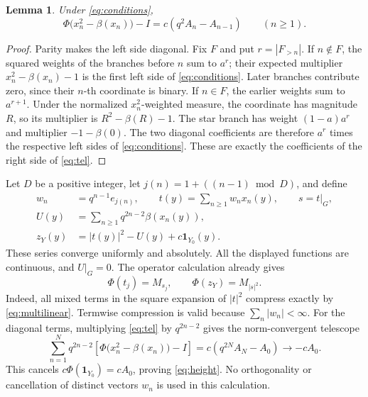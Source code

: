 \documentclass[11pt,letterpaper]{amsart}
\newtheorem{lemma}[theorem]{Lemma}
\theoremstyle{definition}
\theoremstyle{remark}
\numberwithin{equation}{section}
\begin{document}
\begin{lemma}\label{lem:tel}
Under \eqref{eq:conditions},
\begin{equation}\label{eq:tel}
       \Phi\bigl(x_n^2-\beta(x_n)\bigr)-I
                       =c(q^2A_n-A_{n-1})\qquad(n\ge1).
\end{equation}
\end{lemma}
\begin{proof}
Parity makes the left side diagonal. Fix \(F\) and put
\(r=|F_{>n}|\). If \(n\notin F\), the squared weights of the
branches before \(n\) sum to \(a^r\); their expected multiplier
\(x_n^2-\beta(x_n)-1\) is the first left side of
\eqref{eq:conditions}. Later branches contribute zero, since their
\(n\)-th coordinate is binary.
If \(n\in F\), the earlier weights sum to \(a^{r+1}\).
Under the normalized \(x_n^2\)-weighted measure, the coordinate
has magnitude \(R\), so its multiplier is
\(R^2-\beta(R)-1\). The star branch has weight
\((1-a)a^r\) and multiplier \(-1-\beta(0)\).
The two diagonal coefficients are therefore \(a^r\) times the
respective left sides of \eqref{eq:conditions}. These are exactly
the coefficients of the right side of \eqref{eq:tel}.
\end{proof}

Let \(D\) be a positive integer, let
\(j(n)=1+((n-1)\bmod D)\), and define
\begin{equation}\label{eq:encoding}
 \begin{split}
 w_n&=q^{n-1}e_{j(n)},\qquad
 t(y)=\sum_{n\ge1}w_nx_n(y),\qquad s=t|_G,\\
 U(y)&=\sum_{n\ge1}q^{2n-2}\beta(x_n(y)),\\
 z_Y(y)&=|t(y)|^2-U(y)+c\mathbf1_{Y_0}(y).
 \end{split}
\end{equation}
These series converge uniformly and absolutely. All the displayed
functions are continuous, and \(U|_G=0\).
The operator calculation already gives
\begin{equation}\label{eq:height}
                  \Phi(t_j)=M_{s_j},\qquad
                  \Phi(z_Y)=M_{|s|^2}.
\end{equation}
Indeed, all mixed terms in the square expansion of \(|t|^2\)
compress exactly by \eqref{eq:multilinear}. Termwise compression
is valid because \(\sum_n|w_n|<\infty\).
For the diagonal terms, multiplying \eqref{eq:tel} by
\(q^{2n-2}\) gives the norm-convergent telescope
\[
 \sum_{n=1}^Nq^{2n-2}
       \left[\Phi\bigl(x_n^2-\beta(x_n)\bigr)-I\right]
       =c(q^{2N}A_N-A_0)\longrightarrow-cA_0.
\]
This cancels \(c\Phi(\mathbf1_{Y_0})=cA_0\), proving
\eqref{eq:height}. No orthogonality or cancellation of distinct
vectors \(w_n\) is used in this calculation.
\end{document}
